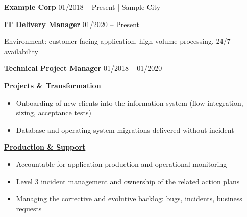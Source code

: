 
\begin{cvparagraph}

\textbf{Example Corp} \hfill 01/2018 -- Present | Sample City

\vspace{2mm}

{\large \textbf{IT Delivery Manager}} \hfill 01/2020 -- Present

\vspace{1mm}

Environment: customer-facing application, high-volume processing, 24/7 availability

\expCurrentBlocks
\vspace{1mm}

{\large \textbf{Technical Project Manager}} \hfill 01/2018 -- 01/2020

\vspace{1mm}

\textbf{\uline{Projects \& Transformation}}
\begin{itemize}
\setlength{\itemsep}{0pt}
\setlength{\parskip}{0pt}
    \item Onboarding of new clients into the information system (flow integration, sizing, acceptance tests)
    \item Database and operating system migrations delivered without incident
\end{itemize}

\textbf{\uline{Production \& Support}}
\begin{itemize}
\setlength{\itemsep}{0pt}
\setlength{\parskip}{0pt}
    \item Accountable for application production and operational monitoring
    \item Level 3 incident management and ownership of the related action plans
    \item Managing the corrective and evolutive backlog: bugs, incidents, business requests
\end{itemize}

\vspace{1mm}

\end{cvparagraph}

\newpage
\vspace*{5mm}


